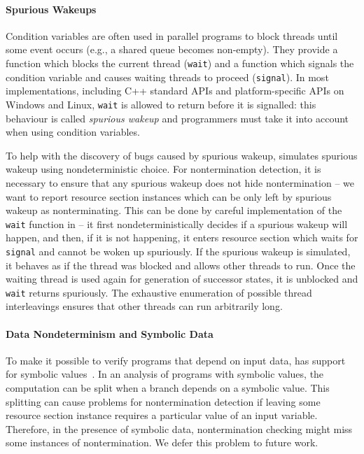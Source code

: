 \paragraph{Spurious Wakeups}
%
Condition variables are often used in parallel programs to block threads until some event occurs (e.g., a shared queue becomes non-empty).
They provide a function which blocks the current thread (\texttt{wait}) and a function which signals the condition variable and causes waiting threads to proceed (\texttt{signal}).
In most implementations, including C++ standard APIs and platform-specific APIs on Windows and Linux, \texttt{wait} is allowed to return before it is signalled: this behaviour is called \emph{spurious wakeup} and programmers must take it into account when using condition variables.

To help with the discovery of bugs caused by spurious wakeup, \divine simulates
spurious wakeup using nondeterministic choice.
For nontermination detection, it is necessary to ensure that any spurious wakeup does not hide nontermination -- we want to report resource section instances which can be only left by spurious wakeup as nonterminating.
This can be done by careful implementation of the \texttt{wait} function in
\divine{} -- it first nondeterministically decides if a spurious wakeup will
happen, and then, if it is not happening, it enters resource section which waits
for \texttt{signal} and cannot be woken up spuriously.
If the spurious wakeup is simulated, it behaves as if the thread was blocked and allows other threads to run.
Once the waiting thread is used again for generation of successor states, it is unblocked and \texttt{wait} returns spuriously.
The exhaustive enumeration of possible thread interleavings ensures that other threads can run arbitrarily long.

\paragraph{Data Nondeterminism and Symbolic Data}
%
To make it possible to verify programs that depend on input data, \divine has support for symbolic values~.
In an analysis of programs with symbolic values, the computation can be split when a branch depends on a symbolic value.
This splitting can cause problems for nontermination detection if leaving some resource section instance requires a particular value of an input variable.
Therefore, in the presence of symbolic data, nontermination checking might miss some instances of nontermination.
We defer this problem to future work.

